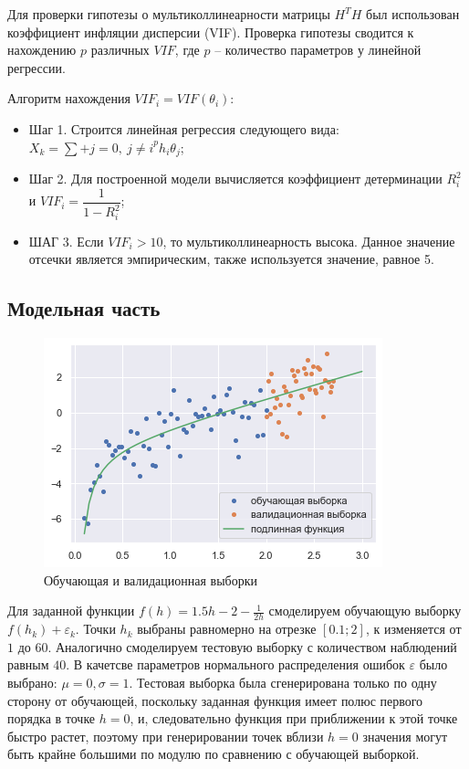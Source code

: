 \documentclass[a4paper,12pt]{article}
\begin{document}
Для проверки гипотезы о мультиколлинеарности матрицы $H^T H$ был использован коэффициент инфляции дисперсии (VIF). Проверка гипотезы сводится к нахождению $p$ различных $VIF$, где $p$ -- количество параметров у линейной регрессии.

Алгоритм нахождения $VIF_i = VIF(\theta_i)$:
\begin{itemize}
    \item Шаг 1. Строится линейная регрессия следующего вида: $X_k = \sum\limits+{j=0,~j \neq i}^p h_i \theta_j$;
    \item Шаг 2. Для построенной модели вычисляется коэффициент детерминации $R_i^2$ и $VIF_i = \dfrac{1}{1-R_i^2}$;
    \item ШАГ 3. Если $VIF_i > 10$, то мультиколлинеарность высока. Данное значение отсечки является эмпирическим, также используется значение, равное 5.
\end{itemize}


\subsection{Модельная часть}

\begin{figure} 
    \vspace{-4ex}
    \includegraphics[width=\linewidth]{src/img/сгенерированная_выборка.png}
    \caption{Обучающая и валидационная выборки}
\end{figure}

Для заданной функции $f(h) = 1.5h - 2 - \frac{1}{2h}$ смоделируем обучающую выборку $f(h_k) + \varepsilon_k$. Точки $h_k$ выбраны равномерно на отрезке $[0.1;2]$, $к$ изменяется от $1$ до $60$. Аналогично смоделируем тестовую выборку с количеством наблюдений равным $40$. В качетсве параметров нормального распределения ошибок $\varepsilon$ было выбрано: $\mu=0, \sigma = 1$. Тестовая выборка была сгенерирована только по одну сторону от обучающей, поскольку заданная функция имеет полюс первого порядка в точке $h = 0$, и, следовательно функция при приближении к этой точке быстро растет, поэтому при генерировании точек вблизи $h=0$ значения могут быть крайне большими по модулю по сравнению с обучающей выборкой.
\newpage
\end{document}
